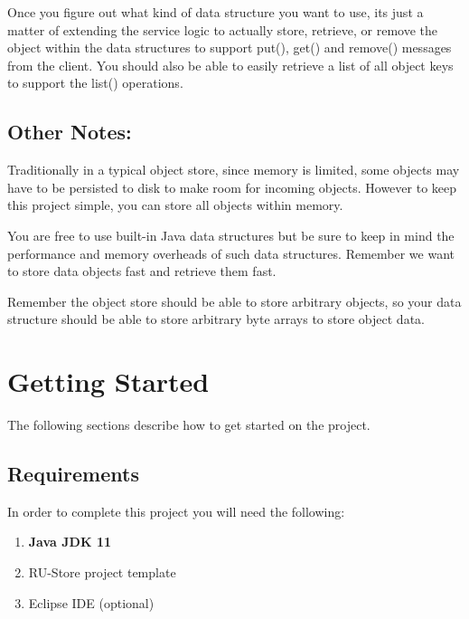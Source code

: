 \documentclass{article}
\begin{document}
Once you figure out what kind of data structure you want to use, its just a matter of extending the service logic to actually store, retrieve, or remove the object within the data structures to support put(), get() and remove() messages from the client. You should also be able to easily retrieve a list of all object keys to support the list() operations. 

\subsection*{Other Notes:}

\begin{info}
Traditionally in a typical object store, since memory is limited, some objects may have to be persisted to disk to make room for incoming objects. However to keep this project simple, you can store all objects within memory. 
\end{info}

\begin{info}
You are free to use built-in Java data structures but be sure to keep in mind the performance and memory overheads of such data structures. Remember we want to store data objects fast and retrieve them fast. 
\end{info}

\begin{info}
Remember the object store should be able to store arbitrary objects, so your data structure should be able to store arbitrary byte arrays to store object data.
\end{info}



\section{Getting Started} %
The following sections describe how to get started on the project. 

\subsection{Requirements}
In order to complete this project you will need the following:
\begin{enumerate}
\item \textbf{Java JDK 11} 
\item RU-Store project template
\item Eclipse IDE (optional)
\end{enumerate}
\end{document}
